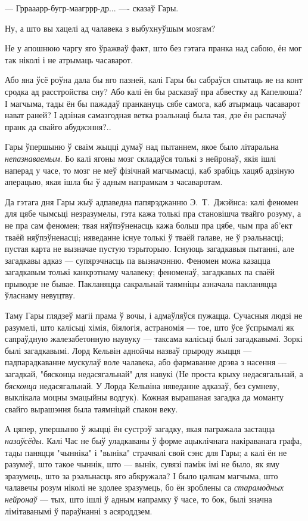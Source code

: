 --- Гррааарр-бугр-маагррр-др... ---- сказаў Гары.

Ну, а што вы хацелі ад чалавека з выбухнуўшым мозгам?

Не у апошнюю чаргу яго ўражваў факт, што без гэтага пранка над сабою,
ён мог так ніколі і не атрымаць часаварот.

Або яна ўсё роўна дала бы яго пазней, калі Гары бы сабраўся спытаць яе на конт сродка 
ад расстройства сну? Або калі ён бы расказаў пра абвестку ад Капелюша? І магчыма,
тады ён бы пажадаў пранкануць сябе самога, каб атырмаць часаварот нават раней? 
І адзіная самазгодная ветка рэальнаці была тая, дзе ён распачаў пранк да свайго 
абуджэння?..

Гары ўпершыню ў сваім жыцці думаў над пытаннем, якое было літаральна \emph{непазнаваемым}.
Бо калі ягоны мозг складаўся толькі з нейронаў, якія ішлі наперад у часе, 
то мозг не меў фізічнай магчымасці, каб зрабіць хацяб адзіную аперацыю, якая 
ішла бы ў адным напрамкам з часаваротам.

Да гэтага дня Гары жыў адпаведна папярэджанню Э.~Т.~Джэйнса: калі 
феномен для цябе чымсьці незразумелы, гэта кажа толькі пра становішча твайго розуму,
а не пра сам феномен; твая няўпэўненасць кажа больш пра цябе, чым пра аб'ект 
тваёй няўпэўненасці; няведанне існуе толькі ў тваёй галаве, не ў рэальнасці;
пустая карта не вызначае пустую тэрыторыю. Існуюць загадкавыя пытанні, але 
загадкавы адказ --- супярэчнасць па вызначэнню.
Феномен можа казацца загадкавым толькі канкрэтнаму чалавеку; феноменаў, загадкавых 
па сваёй прыводзе не бывае. Пакланяцца сакральнай таямніцы азначала пакланяцца 
ўласнаму невуцтву.

Таму Гары глядзеў магіі прама ў вочы, і адмаўляўся пужацца.
Сучасныя людзі не разумелі, што калісьці хімія, біялогія, астраномія ---
тое, што ўсе ўспрымалі як сапраўдную жалезабетонную наувуку --- таксама 
калісьці былі загадкавымі. Зоркі былі загадкавымі. Лорд Кельвін аднойчы 
назваў прыроду жыцця --- падпарадкаванне мускулаў воле чалавека, або фармаванне 
дрэва з насення --- загадкай, "бясконца недасягальнай" для навукі (Не проста 
крыху недасягальнай, а  \emph{бясконца} недасягальнай. У Лорда Кельвіна 
няведанне адказаў, без сумневу, выклікала моцны эмацыйны водгук).
Кожная вырашаная загадка да моманту свайго вырашэння была таямніцай спакон веку.

А цяпер, упершыню ў жыцці ён сустрэў загадку, якая пагражала застацца 
\emph{назаўсёды}. Калі Час не быў уладкаваны ў форме ацыклічнага накіраванага графа,
тады паняцця "чынніка" і "выніка" страчвалі свой сэнс для Гары; а калі 
ён не разумеў, што такое чыннік, што --- вынік, сувязі паміж імі не было,
як яму зразумець, што за рэальнасць яго абкружала? І было цалкам магчыма, што 
чалавечы розум ніколі не здолее зразумець, бо ён зроблены са \emph{старамодных
нейронаў} --- тых, што ішлі ў адным напрамку ў часе, то бок, 
былі значна лімітаванымі ў параўнанні з асяроддзем.

